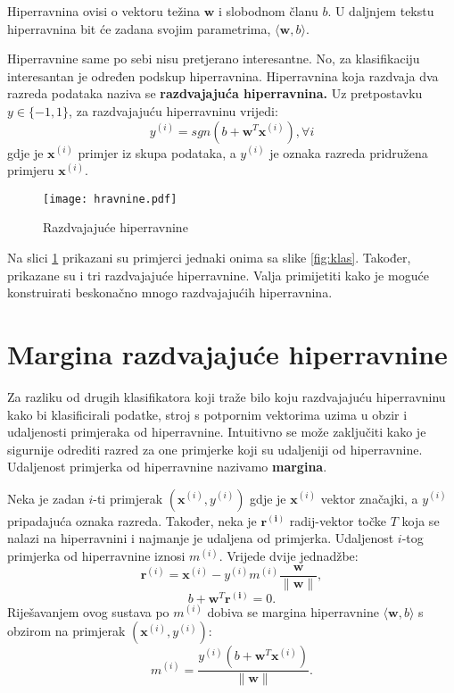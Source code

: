 \documentclass[times, utf8, zavrsni, numeric]{fer}
\newcommand{\hiperravnina}{$\langle \mathbf{w}, b \rangle$}
\begin{document}
Hiperravnina ovisi o vektoru težina $\mathbf{w}$ i slobodnom članu $b$. 
U daljnjem tekstu hiperravnina bit će zadana svojim parametrima, \hiperravnina{}. 

\par Hiperravnine same po sebi nisu pretjerano interesantne. 
No, za klasifikaciju interesantan je određen podskup hiperravnina.
Hiperravnina koja razdvaja dva razreda podataka naziva se \textbf{razdvajajuća hiperravnina.}
Uz pretpostavku $y \in \{-1, 1\}$, za razdvajajuću hiperravninu vrijedi:
\begin{equation}
  y^{(i)} = sgn(b + \mathbf{w}^T\mathbf{x}^{(i)}), \forall i
\end{equation}
gdje je $\mathbf{x}^{(i)}$ primjer iz skupa podataka, a $y^{(i)}$ je oznaka razreda pridružena primjeru $\mathbf{x}^{(i)}$.

\begin{figure}
\centering
\texttt{[image: hravnine.pdf]}
\caption{Razdvajajuće hiperravnine}
\label{fig:hrav}
\end{figure}

Na slici \ref{fig:hrav} prikazani su primjerci jednaki onima sa slike \ref{fig:klas}.
Također, prikazane su i tri razdvajajuće hiperravnine. 
Valja primijetiti kako je moguće konstruirati beskonačno mnogo razdvajajućih hiperravnina.

\section{Margina razdvajajuće hiperravnine} \label{margina}
Za razliku od drugih klasifikatora koji traže bilo koju razdvajajuću hiperravninu kako bi klasificirali podatke,
stroj s potpornim vektorima uzima u obzir i udaljenosti primjeraka od hiperravnine. 
Intuitivno se može zaključiti kako je sigurnije odrediti razred za one primjerke koji su udaljeniji od 
hiperravnine. Udaljenost primjerka od hiperravnine nazivamo \textbf{margina}.

\par Neka je zadan $i$-ti primjerak $(\mathbf{x}^{(i)}, y^{(i)})$ gdje je $\mathbf{x}^{(i)}$ vektor značajki, 
a $y^{(i)}$ pripadajuća oznaka razreda.
Također, neka je $\mathbf{r^{(i)}}$ radij-vektor točke $T$ koja se nalazi na hiperravnini i najmanje je udaljena od primjerka. 
Udaljenost $i$-tog primjerka od hiperravnine iznosi $m^{(i)}$. 
Vrijede dvije jednadžbe:
$$\mathbf{r}^{(i)} = \mathbf{x}^{(i)} - y^{(i)}m^{(i)}\frac{\mathbf{w}}{\|\mathbf{w}\|},$$
$$b + \mathbf{w}^T\mathbf{r^{(i)}} = 0.$$
Riješavanjem ovog sustava po $m^{(i)}$ dobiva se margina hiperravnine \hiperravnina{}
s obzirom na primjerak $(\mathbf{x}^{(i)}, y^{(i)})$:
\begin{equation}
  m^{(i)} = \frac{y^{(i)}(b + \mathbf{w}^T\mathbf{x}^{(i)})}{\|\mathbf{w}\|}.
  \label{eq:marg}
\end{equation}
\end{document}

